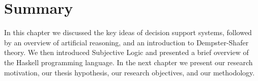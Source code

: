 \documentclass[thesis.tex]{subfiles}
\begin{document}
\section{Summary}

In this chapter we discussed the key ideas of decision support
systems, followed by an overview of artificial reasoning, and an
introduction to Dempster-Shafer theory. We then introduced Subjective
Logic and presented a brief overview of the Haskell programming
language. In the next chapter we present our research motivation,
our thesis hypothesis, our research objectives, and our methodology.
\end{document}
